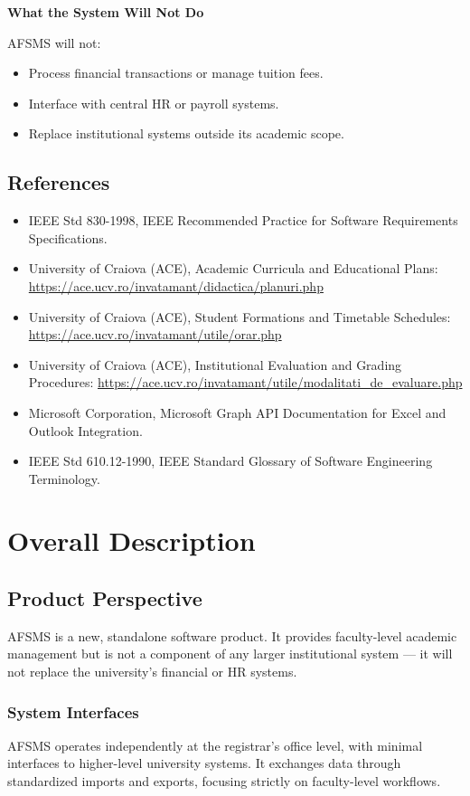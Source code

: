\documentclass[11pt, a4paper]{article}
\begin{document}
\textbf{What the System Will Not Do}

AFSMS will not:
\begin{itemize}
    \item Process financial transactions or manage tuition fees.
    \item Interface with central HR or payroll systems.
    \item Replace institutional systems outside its academic scope.
\end{itemize}

\subsection{References}
\begin{itemize}
    \item IEEE Std 830-1998, IEEE Recommended Practice for Software Requirements Specifications.
    \item University of Craiova (ACE), Academic Curricula and Educational Plans: \url{https://ace.ucv.ro/invatamant/didactica/planuri.php}
    \item University of Craiova (ACE), Student Formations and Timetable Schedules: \url{https://ace.ucv.ro/invatamant/utile/orar.php}
    \item University of Craiova (ACE), Institutional Evaluation and Grading Procedures: \url{https://ace.ucv.ro/invatamant/utile/modalitati_de_evaluare.php}
    \item Microsoft Corporation, Microsoft Graph API Documentation for Excel and Outlook Integration.
    \item IEEE Std 610.12-1990, IEEE Standard Glossary of Software Engineering Terminology.
\end{itemize}


\section{Overall Description}

\subsection{Product Perspective}
AFSMS is a new, standalone software product. It provides faculty-level academic management but is not a component of any larger institutional system --- it will not replace the university's financial or HR systems.

\subsubsection{System Interfaces}
AFSMS operates independently at the registrar's office level, with minimal interfaces to higher-level university systems. It exchanges data through standardized imports and exports, focusing strictly on faculty-level workflows.
\end{document}
